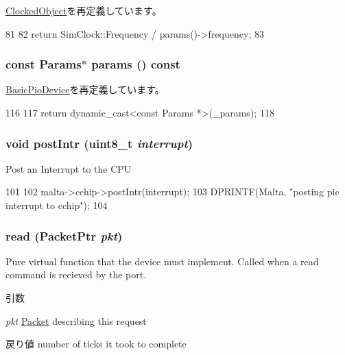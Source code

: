 \hyperlink{classClockedObject_a47ad0ff313f0dcb63b8223b1f11d49d8}{ClockedObject}を再定義しています。


\begin{DoxyCode}
81 {
82     return SimClock::Frequency / params()->frequency;
83 }
\end{DoxyCode}
\hypertarget{classMaltaIO_acd3c3feb78ae7a8f88fe0f110a718dff}{
\subsubsection[{params}]{\setlength{\rightskip}{0pt plus 5cm}const {\bf Params}$\ast$ params () const}}
\label{classMaltaIO_acd3c3feb78ae7a8f88fe0f110a718dff}


\hyperlink{classBasicPioDevice_acd3c3feb78ae7a8f88fe0f110a718dff}{BasicPioDevice}を再定義しています。


\begin{DoxyCode}
116     {
117         return dynamic_cast<const Params *>(_params);
118     }
\end{DoxyCode}
\hypertarget{classMaltaIO_a317c725ef6a1fef61239e5682988cc87}{
\subsubsection[{postIntr}]{\setlength{\rightskip}{0pt plus 5cm}void postIntr (uint8\_\-t {\em interrupt})}}
\label{classMaltaIO_a317c725ef6a1fef61239e5682988cc87}
Post an Interrupt to the CPU 


\begin{DoxyCode}
101 {
102     malta->cchip->postIntr(interrupt);
103     DPRINTF(Malta, "posting pic interrupt to cchip\n");
104 }
\end{DoxyCode}
\hypertarget{classMaltaIO_a613ec7d5e1ec64f8d21fec78ae8e568e}{
\subsubsection[{read}]{ read ({\bf PacketPtr} {\em pkt})}}
\label{classMaltaIO_a613ec7d5e1ec64f8d21fec78ae8e568e}
Pure virtual function that the device must implement. Called when a read command is recieved by the port. 
\begin{DoxyParams}{引数}
\item[{\em pkt}]\hyperlink{classPacket}{Packet} describing this request \end{DoxyParams}
\begin{DoxyReturn}{戻り値}
number of ticks it took to complete 
\end{DoxyReturn}


